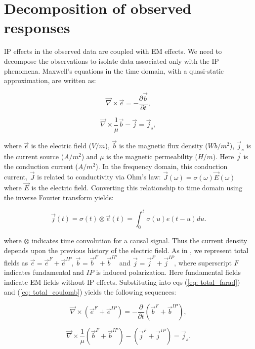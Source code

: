 \documentclass[extra,mreferee]{gji}
\newcommand{\curl}{{\vec \nabla}\times}
\newcommand {\J}{{\vec J}}
\newcommand {\E}{{\vec E}}
\renewcommand {\j}  { {\vec j} }
\renewcommand {\b}  { {\vec b} }
\newcommand {\e}  { {\vec e} }
\begin{document}

\section{Decomposition of observed responses}
IP effects in the observed data are coupled with EM effects. We need to decompose the observations to isolate data associated only with the IP phenomena.  
Maxwell's equations in the time domain, with a quasi-static approximation, are written as:
\begin{linenomath*}
\begin{equation}
  \curl{\e} = -\frac{\partial \b}{\partial t},
  \label{eq: total_farad}
\end{equation}
\end{linenomath*}
\begin{linenomath*}
\begin{equation}
  \curl{\frac{1}{\mu}\b} - \j= \j_{s},
  \label{eq: total_coulomb}
\end{equation}
\end{linenomath*}
where $\e$ is the electric field ($V/m$), $\b$ is the magnetic flux density ($Wb/m^2$), $\j_{s}$ is the current source ($A/m^2$) and $\mu$ is the magnetic permeability ($H/m$). Here $\j$ is the conduction current ($A/m^2$). In the frequency domain, this conduction current, $\J$ is related to conductivity via Ohm’s law: $\J(\omega) = \sigma(\omega)\E(\omega)$ where $\E$ is the electric field. 
Converting this relationship to time domain using the inverse Fourier transform yields:
\begin{linenomath*}
\begin{equation}
  \j(t) = \sigma(t)\otimes \e(t) = \int_0^t \sigma(u) e(t-u) du.
  \label{eq: ohms_law_convolution}
\end{equation}
\end{linenomath*}
where $\otimes$ indicates time convolution for a causal signal.  
Thus the current density depends upon the previous history of the electric field.
As in \cite{Smith1988a}, we represent total fields as $\e = \e^{F} + \e^{IP}$, $\b = \b^{F} + \b^{IP}$ and $\j = \j^{F} + \j^{IP}$, where superscript $F$ indicates fundamental and $IP$ is induced polarization. 
Here fundamental fields indicate EM fields without IP effects. 
Substituting into eqs (\ref{eq: total_farad}) and (\ref{eq: total_coulomb}) yields the following sequences:
\begin{linenomath*}
\begin{equation}
  \curl({\e^{F}+\e^{IP}}) = -\frac{\partial}{\partial t} (\b^{F}+\b^{IP}),
\end{equation}
\end{linenomath*}
\begin{linenomath*}
\begin{equation}
  \curl\frac{1}{\mu}(\b^{F}+\b^{IP}) - (\j^{F}+\j^{IP})= \j_{s}.
\end{equation}
\end{linenomath*}
\end{document}
